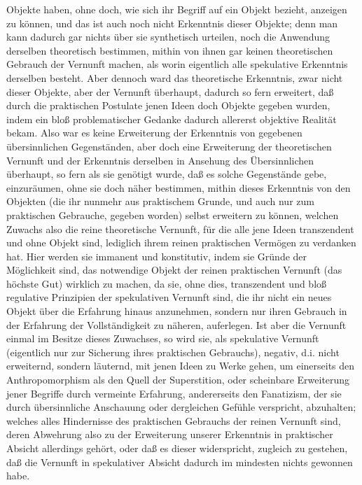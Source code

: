\documentclass[a4paper,12pt,twoside]{book}
\begin{document}
Objekte haben, ohne doch, wie sich ihr Begriff auf ein Objekt bezieht, anzeigen zu können, und das ist auch noch nicht Erkenntnis dieser Objekte; denn man kann dadurch gar nichts über sie synthetisch urteilen, noch die Anwendung derselben theoretisch bestimmen, mithin von ihnen gar keinen theoretischen Gebrauch der Vernunft machen, als worin eigentlich alle spekulative Erkenntnis derselben besteht. Aber dennoch ward das  theoretische Erkenntnis, zwar nicht dieser Objekte, aber der Vernunft überhaupt, dadurch so fern erweitert, daß durch die praktischen Postulate jenen Ideen doch Objekte gegeben wurden, indem ein bloß problematischer Gedanke dadurch allererst objektive Realität bekam. Also war es keine Erweiterung der Erkenntnis von gegebenen übersinnlichen Gegenständen, aber doch eine Erweiterung der theoretischen Vernunft und der Erkenntnis derselben in Ansehung des Übersinnlichen überhaupt, so fern als sie genötigt wurde, daß es solche Gegenstände gebe, einzuräumen, ohne sie doch näher bestimmen, mithin dieses Erkenntnis von den Objekten (die ihr nunmehr aus praktischem Grunde, und auch nur zum praktischen Gebrauche, gegeben worden) selbst erweitern zu können, welchen Zuwachs also die reine theoretische Vernunft, für die alle jene Ideen transzendent und ohne Objekt sind, lediglich ihrem reinen praktischen Vermögen zu verdanken hat. Hier werden sie immanent und konstitutiv, indem sie Gründe der Möglichkeit sind, das notwendige Objekt der reinen praktischen Vernunft (das höchste Gut) wirklich zu machen, da sie, ohne dies, transzendent und bloß regulative Prinzipien der spekulativen Vernunft sind, die ihr nicht ein neues Objekt über die Erfahrung hinaus anzunehmen, sondern nur ihren Gebrauch in der Erfahrung der Vollständigkeit zu näheren, auferlegen. Ist aber die Vernunft einmal im Besitze dieses Zuwachses, so wird sie, als spekulative Vernunft (eigentlich nur zur Sicherung ihres praktischen Gebrauchs), negativ, d.i. nicht erweiternd, sondern läuternd, mit jenen Ideen zu Werke gehen, um einerseits den Anthropomorphism als den Quell der Superstition, oder scheinbare Erweiterung jener Begriffe durch vermeinte Erfahrung, andererseits den Fanatizism, der sie durch übersinnliche Anschauung oder dergleichen Gefühle verspricht, abzuhalten; welches alles Hindernisse des praktischen Gebrauchs der reinen Vernunft sind, deren Abwehrung also zu der Erweiterung unserer Erkenntnis in praktischer Absicht allerdings gehört, oder daß es dieser widerspricht,  zugleich zu gestehen, daß die Vernunft in spekulativer Absicht dadurch im mindesten nichts gewonnen habe. 
	
\end{document}

